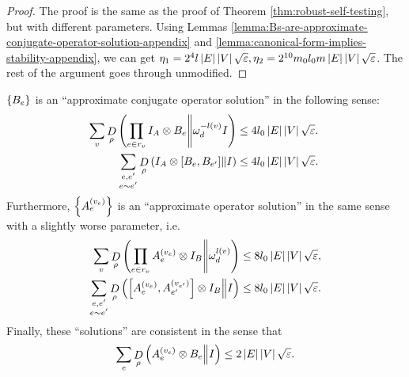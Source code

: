\begin{appendices}
\begin{proof}
	The proof is the same as the proof of Theorem \ref{thm:robust-self-testing}, but with different parameters.
	Using Lemmas \ref{lemma:Bs-are-approximate-conjugate-operator-solution-appendix} and \ref{lemma:canonical-form-implies-stability-appendix}, we can get $\eta_1 = 2^4l\left\vert E\right\vert \left\vert V\right\vert \sqrt {\varepsilon}, \eta_2 = 2^{10}m_0l_0m\left\vert E\right\vert \left\vert V\right\vert \sqrt {\varepsilon}$. The rest of the argument goes through unmodified.
\end{proof}

\begin{lemma}
\label{lemma:Bs-are-approximate-conjugate-operator-solution-appendix}
	$\left\{B_e\right\}$ is an ``approximate conjugate operator solution'' in the following sense:
	\begin{align}
	\label{eq:Bs-approximately-satisfy-constraints-appendix-appendix}
		\sum_v \mathop{D}\limits_{\rho}\left(
		\prod_{e\in r_v} I_A\otimes B_e\middle\| \omega_d^{-l(v)}I\right) 
		&\leq 4l_0\left\vert E\right\vert \left\vert V\right\vert\sqrt{\varepsilon}.
		\\
	\label{eq:Bs-approximately-commute-appendix-appendix}
		\sum_{\substack{e,e'\\e\sim e'}} \mathop{D}\limits_{\rho}\left(I_A\otimes [B_e,B_{e'}]\middle\| I\right)
		&\leq 4l_0 \left\vert E\right\vert\left\vert V\right\vert\sqrt{\varepsilon}
		.\
	\end{align}
	Furthermore, $\left\{A_e^{(v_e)}\right\}$ is an ``approximate operator solution'' in the same sense with a slightly worse parameter, i.e.\ 
	\begin{align}
	\label{eq:As-approximately-satisfy-constraints-appendix-appendix}
		\sum_v\mathop{D}\limits_{\rho}\left(\prod_{e\in r_v}A_e^{(v_e)}\otimes I_B\middle\| \omega_d^{l(v)}\right)
		&\leq 8l_0\left\vert E\right\vert\left\vert V\right\vert\sqrt{\varepsilon},
		\\
	\label{eq:As-approximately-commute-appendix-appendix}
		\sum_{\substack{e,e'\\e\sim e'}} \mathop{D}\limits_{\rho}\left(\left[A_e^{(v_e)},A_{e'}^{(v_{e'})}\right]\otimes I_B\middle\| I\right)
		&\leq 8l_0 \left\vert E\right\vert\left\vert V\right\vert\sqrt{\varepsilon}
		.
	\end{align}
	Finally, these ``solutions'' are consistent in the sense that
	\begin{equation}
	\label{eq:As-and-Bs-approximately-consistent-appendix-appendix}
		\sum_e \mathop{D}\limits_{\rho}\left(A_e^{(v_e)}\otimes B_e\middle\| I\right)
		 \leq 2 \left\vert E\right\vert \left\vert V\right\vert\sqrt{\varepsilon}.
	\end{equation}
\end{lemma}

\begin{lemma}[c.f.\ Lemma \ref{lemma:canonical-form-implies-stability}]
\label{lemma:canonical-form-implies-stability-appendix}
	

\end{lemma}
\end{appendices}
